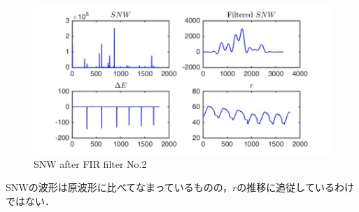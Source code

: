\documentclass[twocolumn,oneside,a4paper]{article}
\begin{document}
\begin{figure}[htbp]
    \includegraphics[bb=0 0 432 216,width=1\columnwidth]{gcodesim_filtered.pdf}
    \caption{SNW after FIR filter No.2}
   \label{fig:filtered}
\end{figure}


SNWの波形は原波形に比べてなまっているものの，$r$の推移に追従しているわけではない．
\end{document}
